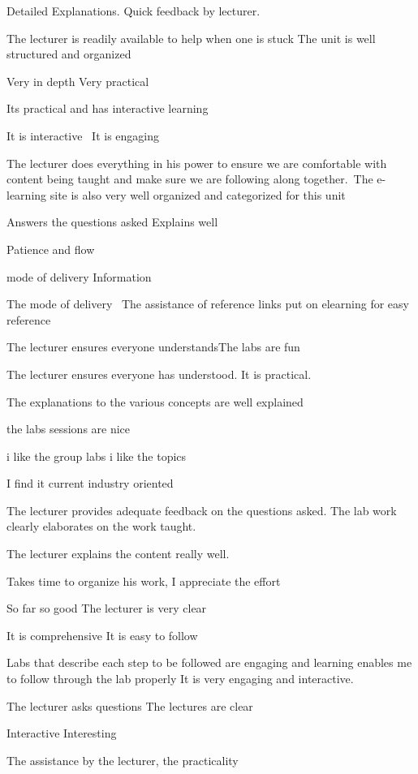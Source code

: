 \documentclass[
]{article}
\begin{document}
\begin{enumerate}
\begin{itemize}
    Detailed Explanations. Quick feedback by lecturer.

    The lecturer is readily available to help when one is stuck The unit
    is well structured and organized

    Very in depth Very practical

    Its practical and has interactive learning~

    It is interactive~ It is engaging

    The lecturer does everything in his power to ensure we are
    comfortable with content being taught and make sure we are following
    along together.~The e-learning site is also very well organized and
    categorized for this unit

    Answers the questions asked Explains well

    Patience and flow

    mode of delivery Information

    The mode of delivery~ The assistance of reference links put on
    elearning for easy reference~

    The lecturer ensures everyone understandsThe labs are fun

    The lecturer ensures everyone has understood. It is practical.

    The explanations to the various concepts are well explained~

    the labs sessions are nice

    i like the group labs i like the topics

    I find it current industry oriented

    The lecturer provides adequate feedback on the questions asked. The
    lab work clearly elaborates on the work taught.

    The lecturer explains the content really well.

    Takes time to organize his work, I appreciate the effort

    So far so good The lecturer is very clear

    It is comprehensive It is easy to follow

    Labs that describe each step to be followed are engaging and
    learning enables me to follow through the lab properly It is very
    engaging and interactive.

    The lecturer asks questions The lectures are clear~

    Interactive Interesting~

    The assistance by the lecturer, the practicality


\end{itemize}
\end{enumerate}
\end{document}
